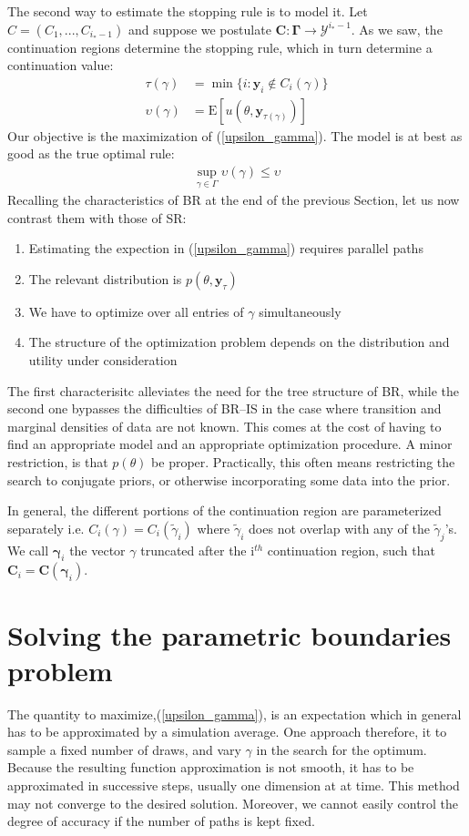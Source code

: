 \documentclass[11pt]{article}
\begin{document}
The second way to estimate the stopping rule is to model it. Let $C=(C_1,...,C_{i_*-1})$ and suppose we postulate $\mathbf{C}:\mathbf{\Gamma}\rightarrow \mathcal{Y}^{i_*-1}$. As we saw, the continuation regions determine the stopping rule, which in turn determine a continuation value:
\begin{align}\label{tau_gamma}
\tau(\gamma)&=\min\{i:\mathbf{y}_i\notin C_i(\gamma)\}\\
\label{upsilon_gamma}
\upsilon(\gamma)&=\mathrm{E}[u(\theta,\mathbf{y}_{\tau(\gamma)})]
\end{align}Our objective is the maximization of (\ref{upsilon_gamma}). The model is at best as good as the true optimal rule:
\begin{align}
\sup_{\gamma\in\Gamma}\upsilon(\gamma)\leq \upsilon
\end{align}Recalling the characteristics of BR at the end of the previous Section, let us now contrast them with those of SR:
\begin{enumerate}
\item Estimating the expection in (\ref{upsilon_gamma}) requires parallel paths
\item The relevant distribution is $p(\theta,\mathbf{y}_\tau)$
\item We have to optimize over all entries of $\gamma$ simultaneously
\item The structure of the optimization problem depends on the distribution and utility under consideration
\end{enumerate}The first characterisitc alleviates the need for the tree structure of BR, while the second one bypasses the difficulties of BR--IS in the case where transition and marginal densities of data are not known. 
This comes at the cost of having to find an appropriate model and an appropriate optimization procedure. A minor restriction, is that $p(\theta)$ be proper. Practically, this often means restricting the search to conjugate priors, or otherwise incorporating some data into the prior\cite[Section 4.3]{gelman2004}.

In general, the different portions of the continuation region are parameterized separately i.e. $C_i(\gamma)=C_i(\tilde \gamma_i)$ where $\tilde \gamma_i$ does not overlap with any of the $\tilde \gamma_j$'s. We call $\boldsymbol{\gamma}_i$ the vector $\gamma$ truncated after the i$^{th}$ continuation region, such that $\mathbf{C}_i=\mathbf{C}(\boldsymbol\gamma_i)$.

\section{Solving the parametric boundaries problem}\label{sec:param}
The quantity to maximize,(\ref{upsilon_gamma}), is an expectation which in general has to be approximated by a simulation average. One approach therefore, it to sample a fixed number of draws, and vary $\gamma$ in the search for the optimum. Because the resulting function approximation is not smooth, it has to be approximated in successive steps, usually one dimension at at time. This method may not converge to the desired solution\cite{glas2004}. Moreover, we cannot easily control the degree of accuracy if the number of paths is kept fixed.
\end{document}
